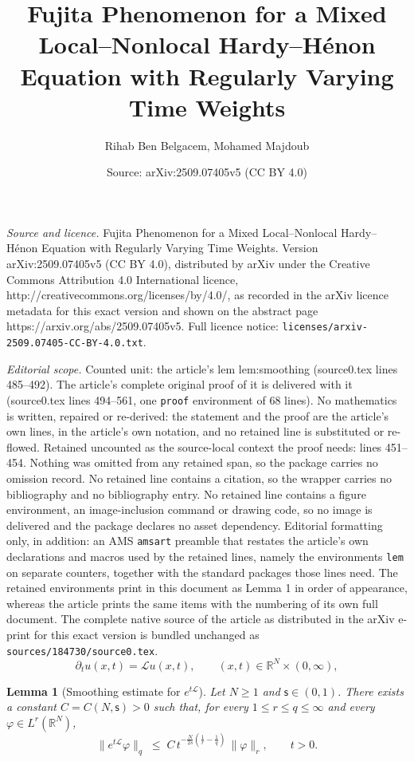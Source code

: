 \documentclass[10pt,a4paper]{amsart}
\title{Fujita Phenomenon for a Mixed Local--Nonlocal Hardy--H\'enon Equation with Regularly Varying Time Weights}
\author{Rihab Ben Belgacem, Mohamed Majdoub}
\date{Source: arXiv:2509.07405v5 (CC BY 4.0)}
\newtheorem{lem}{Lemma}
\newcommand{\R}{\mathbb R}
\newcommand{\ts}{\mathsf{s}}
\begin{document}
\maketitle

\noindent\emph{Source and licence.} Fujita Phenomenon for a Mixed Local--Nonlocal Hardy--H\'enon Equation with Regularly Varying Time Weights. Version arXiv:2509.07405v5 (CC BY 4.0), distributed by arXiv under the Creative Commons Attribution 4.0 International licence, http://creativecommons.org/licenses/by/4.0/, as recorded in the arXiv licence metadata for this exact version and shown on the abstract page https://arxiv.org/abs/2509.07405v5. Full licence notice: \texttt{licenses/arxiv-2509.07405-CC-BY-4.0.txt}.\par\smallskip

\noindent\textit{Editorial scope.} Counted unit: the article's lem lem:smoothing (source0.tex lines 485--492). The article's complete original proof of it is delivered with it (source0.tex lines 494--561, one \texttt{proof} environment of 68 lines). No mathematics is written, repaired or re-derived: the statement and the proof are the article's own lines, in the article's own notation, and no retained line is substituted or re-flowed.  Retained uncounted as the source-local context the proof needs: lines 451--454.  Nothing was omitted from any retained span, so the package carries no omission record.  No retained line contains a citation, so the wrapper carries no bibliography and no bibliography entry.  No retained line contains a figure environment, an image-inclusion command or drawing code, so no image is delivered and the package declares no asset dependency.  Editorial formatting only, in addition: an AMS \texttt{amsart} preamble that restates the article's own declarations and macros used by the retained lines, namely the environments \texttt{lem} on separate counters, together with the standard packages those lines need.  The retained environments print in this document as Lemma 1 in order of appearance, whereas the article prints the same items with the numbering of its own full document.  The complete native source of the article as distributed in the arXiv e-print for this exact version is bundled unchanged as \texttt{sources/184730/source0.tex}.
\begin{equation}\label{eq-1-1-1}
    \partial_t u(x,t) = \mathscr{L} u(x,t),
    \qquad (x,t)\in \R^N\times (0,\infty),
\end{equation}

\begin{lem}[Smoothing estimate for $e^{t\mathscr{L}}$]\label{lem:smoothing}
Let $N\geq 1$ and $\ts\in(0,1)$. There exists a constant $C=C(N,\ts)>0$ such that, for every $1\leq r\leq q\leq\infty$ and every $\varphi\in L^{r}(\mathbb{R}^{N})$,
\begin{equation}\label{eq:smoothing-lemma}
\bigl\|e^{t\mathscr{L}}\varphi\bigr\|_{q}
\;\leq\; C\,t^{-\frac{N}{2s}\left(\frac{1}{r}-\frac{1}{q}\right)}\,
\|\varphi\|_{r},\qquad t>0.
\end{equation}
\end{lem}
\end{document}
